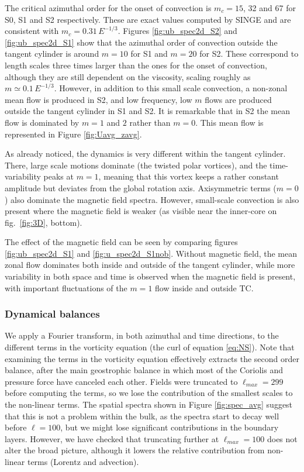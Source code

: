 \documentclass[12pt, a4paper]{article}
\begin{document}
The critical azimuthal order for the onset of convection is $m_c = 15$, 32 and 67 for S0, S1 and S2 respectively.
These are exact values computed by SINGE \citep{vidal2015} and are consistent with $m_c = 0.31\, E^{-1/3}$.
Figures \ref{fig:ub_spec2d_S2} and \ref{fig:ub_spec2d_S1} show that the azimuthal order of convection outside the tangent cylinder is around $m=10$ for S1 and $m=20$ for S2.
These correspond to length scales three times larger than the ones for the onset of convection, although they are still dependent on the viscosity, scaling roughly as $m \simeq 0.1 \, E^{-1/3}$.
However, in addition to this small scale convection, a non-zonal mean flow is produced in S2, and low frequency, low $m$ flows are produced outside the tangent cylinder in S1 and S2.
It is remarkable that in S2 the mean flow is dominated by $m=1$ and $2$ rather than $m=0$. This mean flow is represented in Figure \ref{fig:Uavg_zavg}.

As already noticed, the dynamics is very different within the tangent cylinder.
There, large scale motions dominate (the twisted polar vortices), and the time-variability peaks at $m=1$, meaning that this vortex keeps a rather constant amplitude but deviates from the global rotation axis.
Axisymmetric terms ($m=0$) also dominate the magnetic field spectra.
However, small-scale convection is also present where the magnetic field is weaker (as visible near the inner-core on fig.~\ref{fig:3D}, bottom).

The effect of the magnetic field can be seen by comparing figures \ref{fig:ub_spec2d_S1} and \ref{fig:u_spec2d_S1nob}.
Without magnetic field, the mean zonal flow dominates both inside and outside of the tangent cylinder, while more variability in both space and time is observed when the magnetic field is present, with important fluctuations of the $m=1$ flow inside and outside TC.

\subsubsection{Dynamical balances}

We apply a Fourier transform, in both azimuthal and time directions, to the different terms in the vorticity equation (the curl of equation \ref{eq:NS}).
Note that examining the terms in the vorticity equation effectively extracts the second order balance, after the main geostrophic balance in which most of the Coriolis and pressure force have canceled each other.
Fields were truncated to $\ell_{max}=299$ before computing the terms, so we lose the contribution of the smallest scales to the non-linear terms.
The spatial spectra shown in Figure \ref{fig:spec_avg} suggest that this is not a problem within the bulk, as the spectra start to decay well before $\ell=100$, but we might lose significant contributions in the boundary layers.
However, we have checked that truncating further at $\ell_{max}=100$ does not alter the broad picture, although it lowers the relative contribution from non-linear terms (Lorentz and advection).
\end{document}
